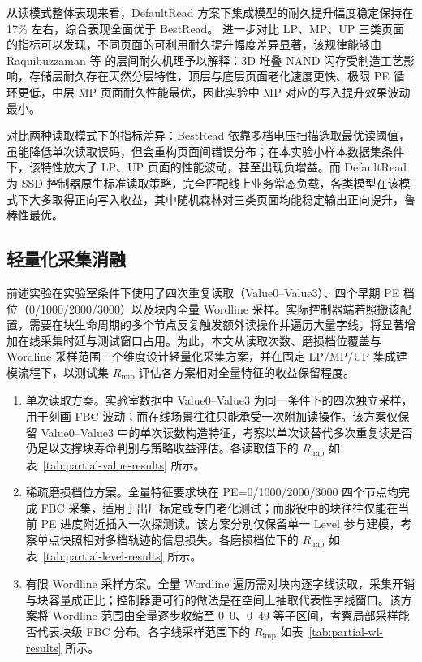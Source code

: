 从读模式整体表现来看，DefaultRead 方案下集成模型的耐久提升幅度稳定保持在 17\% 左右，综合表现全面优于 BestRead。
进一步对比 LP、MP、UP 三类页面的指标可以发现，不同页面的可利用耐久提升幅度差异显著，该规律能够由 Raquibuzzaman 等 \cite {raquibuzzaman2022intrablock} 的层间耐久机理予以解释：3D 堆叠 NAND 闪存受制造工艺影响，存储层耐久存在天然分层特性，顶层与底层页面老化速度更快、极限 PE 循环更低，中层 MP 页面耐久性能最优，因此实验中 MP 对应的写入提升效果波动最小。

对比两种读取模式下的指标差异：BestRead 依靠多档电压扫描选取最优读阈值，虽能降低单次读取误码，但会重构页面间错误分布；在本实验小样本数据集条件下，该特性放大了 LP、UP 页面的性能波动，甚至出现负增益。而 DefaultRead 为 SSD 控制器原生标准读取策略，完全匹配线上业务常态负载，各类模型在该模式下大多取得正向写入收益，其中随机森林对三类页面均能稳定输出正向提升，鲁棒性最优。

\subsection{轻量化采集消融}

前述实验在实验室条件下使用了四次重复读取（Value0--Value3）、四个早期 PE 档位（0/1000/2000/3000）以及块内全量 Wordline 采样。实际控制器端若照搬该配置，需要在块生命周期的多个节点反复触发额外读操作并遍历大量字线，将显著增加在线采集时延与测试窗口占用。为此，本文从读取次数、磨损档位覆盖与 Wordline 采样范围三个维度设计轻量化采集方案，并在固定 LP/MP/UP 集成建模流程下，以测试集 $R_{\mathrm{imp}}$ 评估各方案相对全量特征的收益保留程度。

\begin{enumerate}
    \item 单次读取方案。实验室数据中 Value0--Value3 为同一条件下的四次独立采样，用于刻画 FBC 波动；而在线场景往往只能承受一次附加读操作。该方案仅保留 Value0--Value3 中的单次读数构造特征，考察以单次读替代多次重复读是否仍足以支撑块寿命判别与策略收益评估。各读取值下的 $R_{\mathrm{imp}}$ 如表~\ref{tab:partial-value-results} 所示。

    \item 稀疏磨损档位方案。全量特征要求块在 PE=0/1000/2000/3000 四个节点均完成 FBC 采集，适用于出厂标定或专门老化测试；而服役中的块往往仅能在当前 PE 进度附近插入一次探测读。该方案分别仅保留单一 Level 参与建模，考察单点快照相对多档轨迹的信息损失。各磨损档位下的 $R_{\mathrm{imp}}$ 如表~\ref{tab:partial-level-results} 所示。

    \item 有限 Wordline 采样方案。全量 Wordline 遍历需对块内逐字线读取，采集开销与块容量成正比；控制器更可行的做法是在空间上抽取代表性字线窗口。该方案将 Wordline 范围由全量逐步收缩至 0--0、0--49 等子区间，考察局部采样能否代表块级 FBC 分布。各字线采样范围下的 $R_{\mathrm{imp}}$ 如表~\ref{tab:partial-wl-results} 所示。
\end{enumerate}


